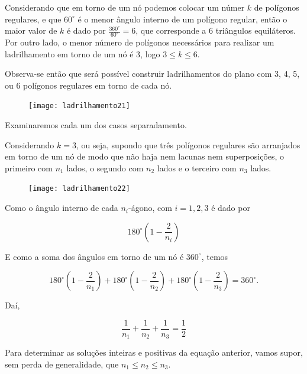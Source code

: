 Considerando que em torno de um nó podemos colocar um númer $k$ de polígonos regulares, e que $60^{\circ}$ é o menor ângulo interno de um polígono regular, então o maior valor de $k$ é dado por $\displaystyle \frac{360^{\circ}}{60^{\circ}} = 6$, que corresponde a 6 triângulos equiláteros. Por outro lado, o menor número de polígonos necessários para realizar um ladrilhamento em torno de um nó é 3, logo $3\leq k \leq 6$.

Observa-se então que será possível construir ladrilhamentos do plano com 3, 4, 5, ou 6 polígonos regulares em torno de cada nó.

\begin{figure}[H]
\centering
\texttt{[image: ladrilhamento21]}

\end{figure}

Examinaremos cada um dos casos separadamento.

Considerando $k=3$, ou seja, supondo que três polígonos regulares são arranjados em torno de um nó de modo que não haja nem lacunas nem superposições, o primeiro com $n_1$ lados, o segundo com $n_2$ lados e o terceiro com $n_3$ lados.

\begin{figure}[H]
\centering
\texttt{[image: ladrilhamento22]}

\end{figure}

Como o ângulo interno de cada $n_i$-ágono, com $i=1,2,3$ é dado por

\begin{equation*}
180^{\circ}\left(1-\frac{2}{n_i}\right)
\end{equation*}

E como a soma dos ângulos em torno de um nó é $360^{\circ}$, temos

\begin{equation*}
180^{\circ}\left(1-\frac{2}{n_1}\right)+180^{\circ}\left(1-\frac{2}{n_2}\right)+180^{\circ}\left(1-\frac{2}{n_3}\right)=360^{\circ}.
\end{equation*}

Daí,

\begin{equation*}
\frac{1}{n_1}+\frac{1}{n_2}+\frac{1}{n_3}=\frac{1}{2}
\end{equation*}

Para determinar as soluções inteiras e positivas da equação anterior, vamos supor, sem perda de generalidade, que $n_1\leq n_2\leq n_3$.

